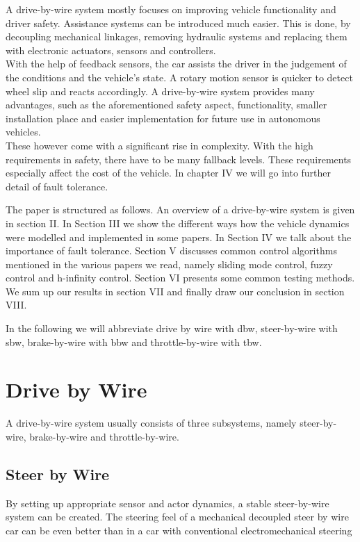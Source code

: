 \documentclass[conference]{IEEEtran}
\begin{document}
A drive-by-wire system mostly focuses on improving vehicle functionality and driver safety. Assistance systems can be introduced much easier. This is done, by decoupling mechanical linkages, removing hydraulic systems and replacing them with electronic actuators, sensors and controllers.\\ With the help of feedback sensors, the car assists the driver in the judgement of the conditions and the vehicle's state. A rotary motion sensor is quicker to detect wheel slip and reacts accordingly. A drive-by-wire system provides many advantages, such as the aforementioned safety aspect, functionality, smaller installation place and easier implementation for future use in autonomous vehicles.
\\These however come with a significant rise in complexity. With the high requirements in safety, there have to be many fallback levels. These requirements especially affect the cost of the vehicle. In chapter IV we will go into further detail of fault tolerance.

The paper is structured as follows. An overview of a drive-by-wire system is given in section II. In Section III we show the different ways how the vehicle dynamics were modelled and implemented in some papers.
In Section IV we talk about the importance of fault tolerance.
Section V discusses common control algorithms mentioned in the various papers we read, namely sliding mode control, fuzzy control and h-infinity control. 
Section VI presents some common testing methods.
We sum up our results in section VII and finally draw our conclusion in section VIII.

In the following we will abbreviate drive by wire with dbw, steer-by-wire with sbw, brake-by-wire with bbw and throttle-by-wire with tbw.

\section{Drive by Wire}

A drive-by-wire system usually consists of three subsystems, namely steer-by-wire, brake-by-wire and throttle-by-wire. 

\subsection{Steer by Wire}

By setting up appropriate sensor and actor dynamics, a stable steer-by-wire system can be created.
The steering feel of a mechanical decoupled steer by wire car can be even better than in a car with conventional electromechanical steering 
\end{document}
